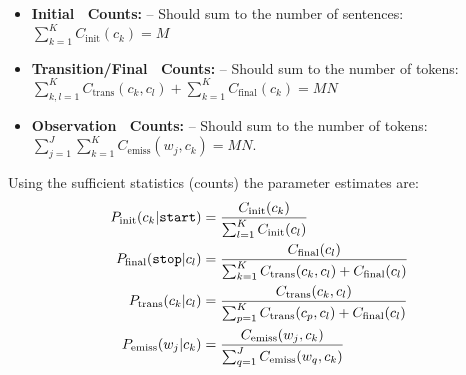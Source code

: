 \begin{itemize}
\item \textbf{Initial \ Counts\!:} -- Should sum to the number of
  sentences: $\sum_{k=1}^K C_{\mathrm{init}}(c_k) = M$
\item \textbf{Transition/Final \ Counts\!:} -- Should sum to the number of
  tokens: 
  $\sum_{k,l=1}^K C_{\mathrm{trans}}(c_k,c_l) + \sum_{k=1}^K C_{\mathrm{final}}(c_k) = MN$
\item \textbf{Observation \ Counts\!:} -- Should sum to the number of tokens: $\sum_{j=1}^J\sum_{k=1}^K C_{\mathrm{emiss}}(w_j,c_k) = MN$.
\end{itemize}

Using the sufficient statistics (counts) the parameter estimates are: 
\begin{align}
  P_{\mathrm{init}}(c_k | \text{\tt start}) &=  \frac{C_{\mathrm{init}}(c_k)}{\sum_{l=1}^K
    C_{\mathrm{init}}(c_l)}\\
  P_{\mathrm{final}}(\text{\tt stop} | c_l) &=  \frac{C_{\mathrm{final}}(c_l)}{\sum_{k=1}^K
    C_{\mathrm{trans}}(c_k,c_l) + C_{\mathrm{final}}(c_l)}\\
  P_{\mathrm{trans}}(c_k | c_l) &=  \frac{C_{\mathrm{trans}}(c_k,c_l)}{\sum_{p=1}^K
    C_{\mathrm{trans}}(c_p,c_l) + C_{\mathrm{final}}(c_l)}\\
  P_{\mathrm{emiss}}(w_j | c_k) &=  \frac{C_{\mathrm{emiss}}(w_j,c_k)}{\sum_{q=1}^J
    C_{\mathrm{emiss}}(w_q,c_k)}
\end{align}


%
%
%
%
%



